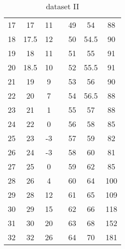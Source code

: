 \begin{table}[H]
{\begin{tabular}{|c|c|c|c|c|c|c|}
	17 & 17 & 11 &  & 49 & 54 & 88 \\ \cline{1-3} \cline{5-7} 
	18 & 17.5 & 12 &  & 50 & 54.5 & 90 \\ \cline{1-3} \cline{5-7} 
	19 & 18 & 11 &  & 51 & 55 & 91 \\ \cline{1-3} \cline{5-7} 
	20 & 18.5 & 10 &  & 52 & 55.5 & 91 \\ \cline{1-3} \cline{5-7} 
	21 & 19 & 9 &  & 53 & 56 & 90 \\ \cline{1-3} \cline{5-7} 
	22 & 20 & 7 &  & 54 & 56.5 & 88 \\ \cline{1-3} \cline{5-7} 
	23 & 21 & 1 &  & 55 & 57 & 88 \\ \cline{1-3} \cline{5-7} 
	24 & 22 & 0 &  & 56 & 58 & 85 \\ \cline{1-3} \cline{5-7} 
	25 & 23 & -3 &  & 57 & 59 & 82 \\ \cline{1-3} \cline{5-7} 
	26 & 24 & -3 &  & 58 & 60 & 81 \\ \cline{1-3} \cline{5-7} 
	27 & 25 & 0 &  & 59 & 62 & 85 \\ \cline{1-3} \cline{5-7} 
	28 & 26 & 4 &  & 60 & 64 & 100 \\ \cline{1-3} \cline{5-7} 
	29 & 28 & 12 &  & 61 & 65 & 109 \\ \cline{1-3} \cline{5-7} 
	30 & 29 & 15 &  & 62 & 66 & 118 \\ \cline{1-3} \cline{5-7} 
	31 & 30 & 20 &  & 63 & 68 & 152 \\ \cline{1-3} \cline{5-7} 
	32 & 32 & 26 &  & 64 & 70 & 181 \\ \cline{1-3} \cline{5-7} 
	\end{tabular}%
	}
	\caption{dataset II}
	\label{tab:2}
	\end{table}